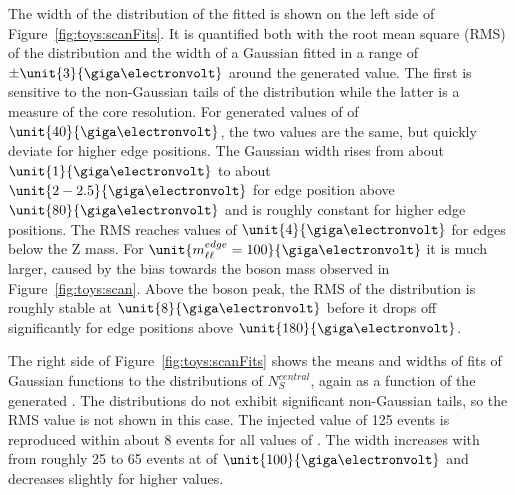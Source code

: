 The width of the distribution of the fitted \mlledge is shown on the left side of Figure~\ref{fig:toys:scanFits}. It is quantified both with the root mean square (RMS) of the distribution and the width of a Gaussian fitted in a range of $\pm\unit{3}{\giga\electronvolt}$ around the generated value. The first is sensitive to the non-Gaussian tails of the distribution while the latter is a measure of the core resolution. For generated values of \mlledge of $\unit{40}{\giga\electronvolt}$, the two values are the same, but quickly deviate for higher edge positions. The Gaussian width rises from about $\unit{1}{\giga\electronvolt}$ to about $\unit{2-2.5}{\giga\electronvolt}$ for edge position above $\unit{80}{\giga\electronvolt}$ and is roughly constant for higher edge positions. The RMS reaches values of $\unit{4}{\giga\electronvolt}$ for edges below the Z mass. For $\unit{\mlledge=100}{\giga\electronvolt}$ it is much larger, caused by the bias towards the \Z boson mass observed in Figure~\ref{fig:toys:scan}. Above the \Z boson peak, the RMS of the distribution is roughly stable at $\unit{8}{\giga\electronvolt}$ before it drops off significantly for edge positions above $\unit{180}{\giga\electronvolt}$.

The right side of Figure~\ref{fig:toys:scanFits} shows the means and widths of fits of Gaussian functions to the distributions of $N_{S}^{central}$, again as a function of the generated \mlledge. The distributions do not exhibit significant non-Gaussian tails, so the RMS value is not shown in this case. The injected value of 125 events is reproduced within about 8 events for all values of \mlledge. The width increases with \mlledge from roughly 25 to 65 events at \mlledge of $\unit{100}{\giga\electronvolt}$ and decreases slightly for higher values.


